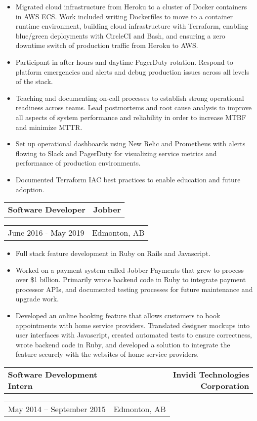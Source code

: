 \documentclass[10pt,letterpaper]{article}
\makeatletter
\newcommand{\headerrow}[2]
{\begin{tabular*}{\linewidth}{l@{\extracolsep{\fill}}r}
	#1 &
	#2 \\
\end{tabular*}}
\makeatother
\begin{document}
       \begin{itemize}
          \itemsep0em
                \item Migrated cloud infrastructure from Heroku to a cluster of Docker containers in AWS ECS. Work included writing Dockerfiles to move to a container runtime environment, building cloud infrastructure with Terraform, enabling blue/green deployments with CircleCI and Bash, and ensuring a zero downtime switch of production traffic from Heroku to AWS.
                \item Participant in after-hours and daytime PagerDuty rotation. Respond to platform emergencies and alerts and debug production issues across all levels of the stack.
                \item Teaching and documenting on-call processes to establish strong operational readiness across teams. Lead postmortems and root cause analysis to improve all aspects of system performance and reliability in order to increase MTBF and minimize MTTR.
                \item Set up operational dashboards using New Relic and Prometheus with alerts flowing to Slack and PagerDuty for visualizing service metrics and performance of production environments.
                \item Documented Terraform IAC best practices to enable education and future adoption.
        \end{itemize}
       \headerrow
       	        {\textbf{Software Developer}}
	        {\textbf{Jobber}}
	\headerrow
		{June 2016 - May 2019}
		{Edmonton, AB}

       \begin{itemize}
          \itemsep0em
          	\item Full stack feature development in Ruby on Rails and Javascript.
                \item Worked on a payment system called Jobber Payments that grew to process over \$1 billion. Primarily wrote backend code in Ruby to integrate payment processor APIs, and documented testing processes for future maintenance and upgrade work.
                \item Developed an online booking feature that allows customers to book appointments with home service providers. Translated designer mockups into user interfaces with Javascript, created automated tests to ensure correctness, wrote backend code in Ruby, and developed a solution to integrate the feature securely with the websites of home service providers.
        \end{itemize}	
       \headerrow
                {\textbf{Software Development Intern}}
		{\textbf{Invidi Technologies Corporation}}
       \headerrow
		{May 2014 -- September 2015 }
                {Edmonton, AB}
\end{document}
